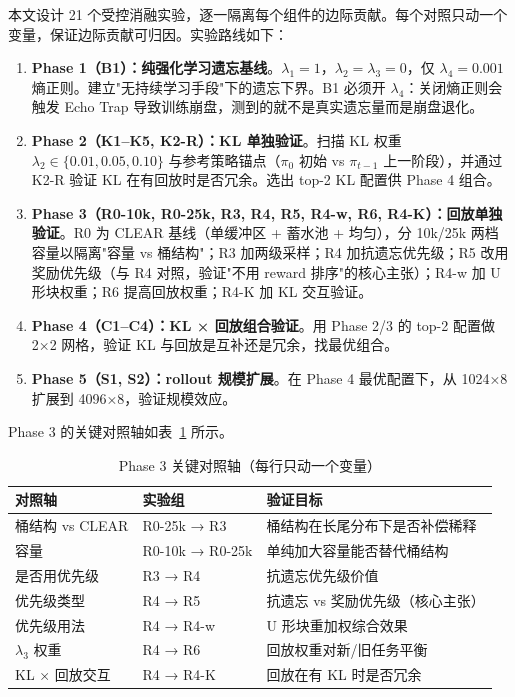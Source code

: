 本文设计 21 个受控消融实验，逐一隔离每个组件的边际贡献。每个对照只动一个变量，保证边际贡献可归因。实验路线如下：

\begin{enumerate}
  \item \textbf{Phase 1（B1）：纯强化学习遗忘基线}。$\lambda_1=1$，$\lambda_2=\lambda_3=0$，仅 $\lambda_4=0.001$ 熵正则。建立"无持续学习手段"下的遗忘下界。B1 必须开 $\lambda_4$：关闭熵正则会触发 Echo Trap 导致训练崩盘，测到的就不是真实遗忘量而是崩盘退化。
  \item \textbf{Phase 2（K1--K5, K2-R）：KL 单独验证}。扫描 KL 权重 $\lambda_2\in\{0.01,0.05,0.10\}$ 与参考策略锚点（$\pi_0$ 初始 vs $\pi_{t-1}$ 上一阶段），并通过 K2-R 验证 KL 在有回放时是否冗余。选出 top-2 KL 配置供 Phase 4 组合。
  \item \textbf{Phase 3（R0-10k, R0-25k, R3, R4, R5, R4-w, R6, R4-K）：回放单独验证}。R0 为 CLEAR 基线（单缓冲区 + 蓄水池 + 均匀），分 10k/25k 两档容量以隔离"容量 vs 桶结构"；R3 加两级采样；R4 加抗遗忘优先级；R5 改用奖励优先级（与 R4 对照，验证"不用 reward 排序"的核心主张）；R4-w 加 U 形块权重；R6 提高回放权重；R4-K 加 KL 交互验证。
  \item \textbf{Phase 4（C1--C4）：KL × 回放组合验证}。用 Phase 2/3 的 top-2 配置做 2×2 网格，验证 KL 与回放是互补还是冗余，找最优组合。
  \item \textbf{Phase 5（S1, S2）：rollout 规模扩展}。在 Phase 4 最优配置下，从 1024×8 扩展到 4096×8，验证规模效应。
\end{enumerate}

Phase 3 的关键对照轴如表~\ref{tab:ablation} 所示。

\begin{table}[htbp]
\centering
\caption{Phase 3 关键对照轴（每行只动一个变量）}
\label{tab:ablation}
\begin{tabular}{lll}
\toprule[1.5pt]
对照轴 & 实验组 & 验证目标 \\
\midrule[1pt]
桶结构 vs CLEAR & R0-25k → R3 & 桶结构在长尾分布下是否补偿稀释 \\
容量 & R0-10k → R0-25k & 单纯加大容量能否替代桶结构 \\
是否用优先级 & R3 → R4 & 抗遗忘优先级价值 \\
优先级类型 & R4 → R5 & 抗遗忘 vs 奖励优先级（核心主张） \\
优先级用法 & R4 → R4-w & U 形块重加权综合效果 \\
$\lambda_3$ 权重 & R4 → R6 & 回放权重对新/旧任务平衡 \\
KL × 回放交互 & R4 → R4-K & 回放在有 KL 时是否冗余 \\
\bottomrule[1.5pt]
\end{tabular}
\end{table}


